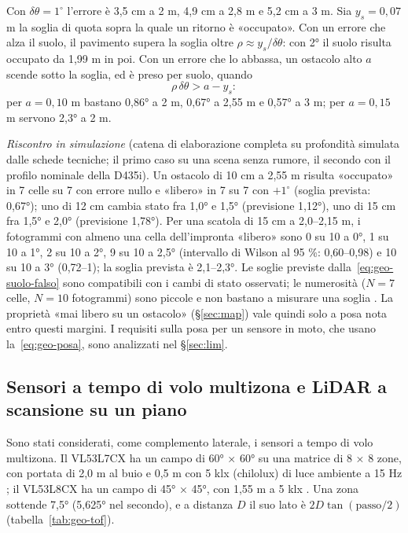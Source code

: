 Con $\delta\theta=1^\circ$ l'errore è 3,5 cm a 2 m, 4,9 cm a 2,8 m e 5,2 cm a 3 m. Sia $y_s=0{,}07$ m la soglia di quota sopra la quale un ritorno è «occupato». Con un errore che alza il suolo, il pavimento supera la soglia oltre $\rho\approx y_s/\delta\theta$: con 2° il suolo risulta occupato da 1,99 m in poi. Con un errore che lo abbassa, un ostacolo alto $a$ scende sotto la soglia, ed è preso per suolo, quando
\begin{equation}\label{eq:geo-suolo-falso}
\rho\,\delta\theta>a-y_s :
\end{equation}
per $a=0{,}10$ m bastano 0,86° a 2 m, 0,67° a 2,55 m e 0,57° a 3 m; per $a=0{,}15$ m servono 2,3° a 2 m.

\emph{Riscontro in simulazione} (catena di elaborazione completa su profondità simulata dalle schede tecniche; il primo caso su una scena senza rumore, il secondo con il profilo nominale della D435i). Un ostacolo di 10 cm a 2,55 m risulta «occupato» in 7 celle su 7 con errore nullo e «libero» in 7 su 7 con $+1^\circ$ (soglia prevista: 0,67°); uno di 12 cm cambia stato fra 1,0° e 1,5° (previsione 1,12°), uno di 15 cm fra 1,5° e 2,0° (previsione 1,78°). Per una scatola di 15 cm a 2,0--2,15 m, i fotogrammi con almeno una cella dell'impronta «libero» sono 0 su 10 a 0°, 1 su 10 a 1°, 2 su 10 a 2°, 9 su 10 a 2,5° (intervallo di Wilson al 95 \%: 0,60--0,98) e 10 su 10 a 3° (0,72--1); la soglia prevista è 2,1--2,3°. Le soglie previste dalla~\eqref{eq:geo-suolo-falso} sono compatibili con i cambi di stato osservati; le numerosità ($N=7$ celle, $N=10$ fotogrammi) sono piccole e non bastano a misurare una soglia . La proprietà «mai libero su un ostacolo» (\S\ref{sec:map}) vale quindi solo a posa nota entro questi margini. I requisiti sulla posa per un sensore in moto, che usano la~\eqref{eq:geo-posa}, sono analizzati nel \S\ref{sec:lim}.

\subsection{Sensori a tempo di volo multizona e LiDAR a scansione su un piano}\label{sec:geo-altri}

Sono stati considerati, come complemento laterale, i sensori a tempo di volo multizona. Il VL53L7CX ha un campo di 60° × 60° su una matrice di 8 × 8 zone, con portata di 2,0 m al buio e 0,5 m con 5 klx (chilolux) di luce ambiente a 15 Hz \cite{st-vl53l7cx}; il VL53L8CX ha un campo di 45° × 45°, con 1,55 m a 5 klx \cite{st-vl53l8cx}. Una zona sottende 7,5° (5,625° nel secondo), e a distanza $D$ il suo lato è $2D\tan(\text{passo}/2)$ (tabella~\ref{tab:geo-tof}).

